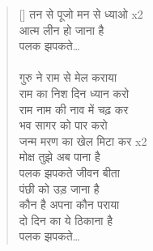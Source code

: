 \begin{verse}[\versewidth]
{तन से पूजो मन से ध्याओ x2\\
आत्म लीन हो जाना है\\
पलक झपकते…\\
\\
गुरु ने राम से मेल कराया\\
राम का निश दिन ध्यान करो\\
राम नाम की नाव में चढ़ कर\\
भव सागर को पार करो\\
जन्म मरण का खेल मिटा कर x2\\
मोक्ष तुझे अब पाना है\\
पलक झपकते जीवन बीता\\
पंछी को उड़ जाना है\\
कौन है अपना कौन पराया\\
दो दिन का ये ठिकाना है\\
पलक झपकते…
}
\end{verse}

